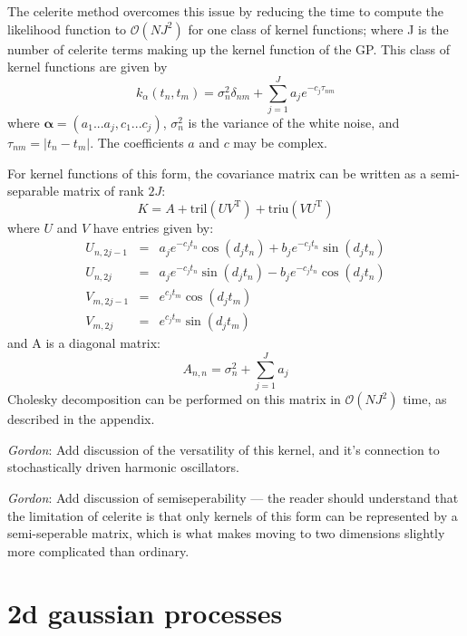 \documentclass[modern]{aastex62}
\newcommand{\todo}[3]{{\color{#2}\emph{#1}: #3}}
\newcommand{\gordontodo}[1]{\todo{Gordon}{red}{#1}}
\newcommand{\project}[1]{\textsf{#1}}
\newcommand{\celerite}{\project{celerite }}
\newcommand{\bvec}[1]{{\ensuremath{\boldsymbol{#1}}}}
\newcommand{\T}{\ensuremath{\mathrm{T}}}
\begin{document}
		The \celerite method overcomes this issue by reducing the time to compute the likelihood function to $\mathcal{O}(NJ^2)$ for one 
		class of kernel functions; where J is the number of \celerite terms making up the kernel function of the GP. This class of kernel functions are given by 
		\begin{equation}
			k_\alpha(t_n, t_m) = \sigma_n^2 \delta_{nm} + \sum_{j=1}^J a_j e^{-c_j\tau_{nm}}
		\end{equation}
		where $\bvec{\alpha} = (a_1...a_j, c_1...c_j)$, $\sigma_n^2$ is the variance of the white noise, and $\tau_{nm} = |t_n-t_m|$. 
		The coefficients $a$ and $c$ may be complex.
	
		For kernel functions of this form, the covariance matrix can be written as a semi-separable matrix of rank $2J$:
		\begin{equation}
			K = A + \mathrm{tril}(UV^\T) + \mathrm{triu}(VU^\T)
		\end{equation}
		where $U$ and $V$ have entries given by: 
		\begin{eqnarray}
			U_{n, 2j-1} &=& a_je^{-c_jt_n}\cos(d_jt_n) + b_je^{-c_jt_n}\sin(d_jt_n) \nonumber \\
			U_{n, 2j} &=& a_je^{-c_jt_n}\sin(d_jt_n) - b_je^{-c_jt_n}\cos(d_jt_n) \nonumber \\
			V_{m, 2j-1} &=& e^{c_jt_m}\cos(d_jt_m) \nonumber \\
			V_{m, 2j} &=& e^{c_jt_m}\sin(d_jt_m)
		\end{eqnarray}
		and A is a diagonal matrix:
		\begin{equation}
			A_{n,n} = \sigma_n^2 + \sum_{j=1}^Ja_j
		\end{equation}
		Cholesky decomposition can be performed on this matrix in $\mathcal{O}(NJ^2)$ time, as described in the appendix. 
		 
		\gordontodo{Add discussion of the versatility of this kernel, and it's connection to stochastically driven harmonic oscillators.}
		
		\gordontodo{Add discussion of semiseperability --- the reader should understand that the limitation of \celerite is that only kernels of this form can be 
		represented by a semi-seperable matrix, which is what makes moving to two dimensions slightly more complicated than ordinary.}
		

\section{2d gaussian processes}
\end{document}
